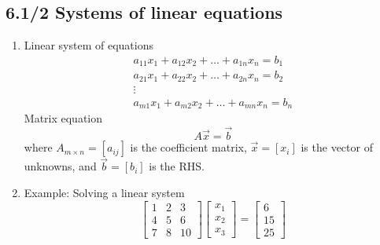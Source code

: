 \documentclass{article}
\theoremstyle{remark}
\begin{document}
\subsection{6.1/2 Systems of linear equations}

\begin{enumerate}
\item Linear system of equations
\begin{eqnarray*}
a_{11}x_1+ a_{12}x_2+\dots+a_{1n}x_n = b_1\\
a_{21}x_1+ a_{22}x_2+\dots+a_{2n}x_n = b_2\\
\vdots~~~~~~~~~~~~~~~~~~~\\
a_{m1}x_1+ a_{m2}x_2+\dots+a_{mn}x_n = b_n
\end{eqnarray*}
Matrix equation
$$
A\vec x = \vec b
$$
where $A_{m\times n} = [a_{ij}]$ is the coefficient matrix, $\vec{x} = [x_i]$ is the vector of unknowns, and $\vec{b}=[b_i]$ is the RHS.

\item Example: Solving a linear system
$$
\begin{bmatrix}
1 & 2 & 3\\
4 & 5 & 6\\
7 & 8 & 10
\end{bmatrix}
\begin{bmatrix}
x_1\\
x_2\\
x_3
\end{bmatrix} = 
\begin{bmatrix}
6\\
15\\
25
\end{bmatrix}
$$


\end{enumerate}
\end{document}
